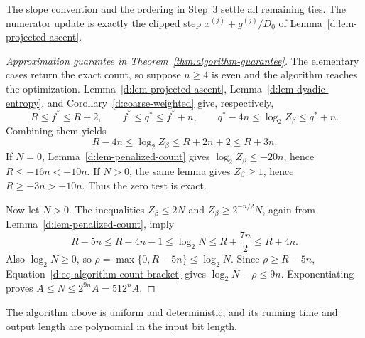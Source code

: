 The slope convention and the ordering in Step~3 settle all remaining
ties.  The numerator update is exactly the clipped step
\(x^{(j)}+g^{(j)}/D_0\) of Lemma~\ref{d:lem-projected-ascent}.

\begin{proof}[Approximation guarantee in Theorem~\ref{thm:algorithm-guarantee}]
The elementary cases return the exact count, so suppose \(n\ge4\) is
even and the algorithm reaches the optimization.
Lemma~\ref{d:lem-projected-ascent}, Lemma~\ref{d:lem-dyadic-entropy}, and
Corollary~\ref{d:coarse-weighted} give, respectively,
\[
 R\le f^*\le R+2,\qquad
 f^*\le q^*\le f^*+n,\qquad
 q^*-4n\le\log_2 Z_\beta\le q^*+n.
\]
Combining them yields
\begin{equation}
\label{d:eq-algorithm-partition-bracket}
       R-4n\le\log_2 Z_\beta
              \le R+2n+2\le R+3n.
\end{equation}
If \(N=0\), Lemma~\ref{d:lem-penalized-count} gives
\(\log_2 Z_\beta\le-20n\), hence \(R\le-16n<-10n\).
If \(N>0\), the same lemma gives \(Z_\beta\ge1\), hence
\(R\ge-3n>-10n\).  Thus the zero test is exact.

Now let \(N>0\).
The inequalities \(Z_\beta\le2N\) and
\(Z_\beta\ge2^{-n/2}N\), again from
Lemma~\ref{d:lem-penalized-count}, imply
\begin{equation}
\label{d:eq-algorithm-count-bracket}
 R-5n
   \le R-4n-1
   \le\log_2 N
   \le R+\frac{7n}{2}
   \le R+4n.
\end{equation}
Also \(\log_2N\ge0\), so
\(\rho=\max\{0,R-5n\}\le\log_2N\).
Since \(\rho\ge R-5n\), Equation~\eqref{d:eq-algorithm-count-bracket} gives
\(\log_2N-\rho\le9n\).
Exponentiating proves \(A\le N\le2^{9n}A=512^nA\).
\end{proof}

\begin{proposition}
\label{d:prop-bit-complexity}
The algorithm above is uniform and deterministic, and its running time
and output length are polynomial in the input bit length.
\end{proposition}

